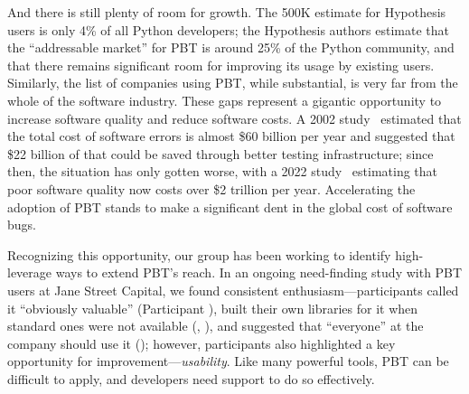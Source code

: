 And there is still plenty of room
for growth.
The 500K estimate for
Hypothesis users is only 4\% of all Python developers; the Hypothesis
authors estimate that the ``addressable market'' for PBT is around
25\% of the Python
community, and that there remains significant room for
improving its usage by existing users.
Similarly, the list of
companies using PBT, while substantial, is very far from the whole of the software
industry.
These gaps represent a gigantic opportunity to increase software quality
and reduce software costs.
A 2002 study~\cn{} estimated that the total cost of software errors is almost
\$60 billion per year and suggested that \$22 billion of that could be
saved through
better testing infrastructure; since then, the situation has only gotten worse, with a 2022
study~\cn{} estimating that poor software quality now costs over \$2 trillion per
year. Accelerating the adoption of PBT stands to make a
significant dent
in the global cost of software bugs.

Recognizing this opportunity, our group has been working to identify
high-leverage ways to extend PBT's reach.
In an ongoing need-finding study with PBT users at Jane Street
Capital, we found consistent enthusiasm---participants called it
``obviously valuable'' (Participant ), built their own
libraries for it when standard ones were not available
(, ), and suggested that ``everyone''
at the company should use it (); however, participants
also highlighted a key opportunity for improvement---{\em usability}. Like
many powerful tools, PBT can be difficult to apply, and developers
need support to do so effectively.


